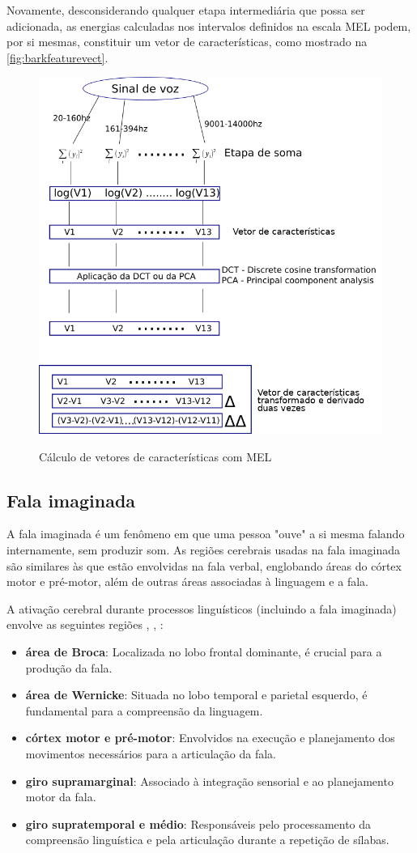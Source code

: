 			\par Novamente, desconsiderando qualquer etapa intermediária que possa ser adicionada, as energias calculadas nos intervalos definidos na escala MEL podem, por si mesmas, constituir um vetor de características, como mostrado na  \autoref{fig:barkfeaturevect}.
			
			\begin{figure}[h]
				\centering
				\caption{Cálculo de vetores de características com MEL}
				\includegraphics[width=0.6\linewidth]{images/melFeatureVect}
				\label{fig:melfeaturevect}
			\end{figure}
			
		\subsection{Fala imaginada}
			
			\par A fala imaginada é um fenômeno em que uma pessoa "ouve" a si mesma falando internamente, sem produzir som. As regiões cerebrais usadas na fala imaginada são similares às que estão envolvidas na fala verbal, englobando áreas do córtex motor e pré-motor, além de outras áreas associadas à linguagem e a fala.
			
			\par A ativação cerebral durante processos linguísticos (incluindo a fala imaginada) envolve as seguintes regiões \cite{pinto2012manual}, \cite{Vanderah2020}, \cite{kenhub}:
			
			\begin{itemize}
				\item \textbf{área de Broca}: Localizada no lobo frontal dominante, é crucial para a produção da fala.
				\item \textbf{área de Wernicke}: Situada no lobo temporal e parietal esquerdo, é fundamental para a compreensão da linguagem.
				\item \textbf{córtex motor e pré-motor}: Envolvidos na execução e planejamento dos movimentos necessários para a articulação da fala.
				\item \textbf{giro supramarginal}: Associado à integração sensorial e ao planejamento motor da fala.
				\item \textbf{giro supratemporal e médio}: Responsáveis pelo processamento da compreensão linguística e pela articulação durante a repetição de sílabas.
			\end{itemize}
			
